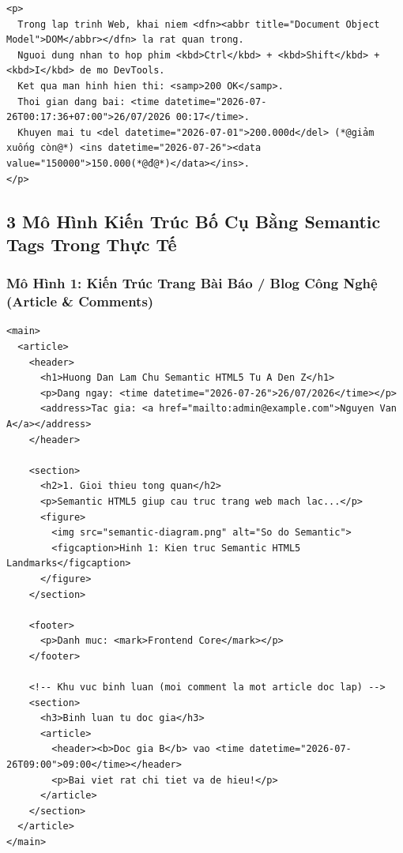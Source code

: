 \begin{codeWindow}
\begin{lstlisting}[language=HTML5]
<p>
  Trong lap trinh Web, khai niem <dfn><abbr title="Document Object Model">DOM</abbr></dfn> la rat quan trong.
  Nguoi dung nhan to hop phim <kbd>Ctrl</kbd> + <kbd>Shift</kbd> + <kbd>I</kbd> de mo DevTools.
  Ket qua man hinh hien thi: <samp>200 OK</samp>.
  Thoi gian dang bai: <time datetime="2026-07-26T00:17:36+07:00">26/07/2026 00:17</time>.
  Khuyen mai tu <del datetime="2026-07-01">200.000d</del> (*@giảm xuống còn@*) <ins datetime="2026-07-26"><data value="150000">150.000(*@đ@*)</data></ins>.
</p>
\end{lstlisting}
\end{codeWindow}

\clearpage
\subsection{3 Mô Hình Kiến Trúc Bố Cụ Bằng Semantic Tags Trong Thực Tế}

\subsubsection{Mô Hình 1: Kiến Trúc Trang Bài Báo / Blog Công Nghệ (Article \& Comments)}

\begin{codeWindowBreakable}
\begin{lstlisting}[language=HTML5]
<main>
  <article>
    <header>
      <h1>Huong Dan Lam Chu Semantic HTML5 Tu A Den Z</h1>
      <p>Dang ngay: <time datetime="2026-07-26">26/07/2026</time></p>
      <address>Tac gia: <a href="mailto:admin@example.com">Nguyen Van A</a></address>
    </header>

    <section>
      <h2>1. Gioi thieu tong quan</h2>
      <p>Semantic HTML5 giup cau truc trang web mach lac...</p>
      <figure>
        <img src="semantic-diagram.png" alt="So do Semantic">
        <figcaption>Hinh 1: Kien truc Semantic HTML5 Landmarks</figcaption>
      </figure>
    </section>

    <footer>
      <p>Danh muc: <mark>Frontend Core</mark></p>
    </footer>

    <!-- Khu vuc binh luan (moi comment la mot article doc lap) -->
    <section>
      <h3>Binh luan tu doc gia</h3>
      <article>
        <header><b>Doc gia B</b> vao <time datetime="2026-07-26T09:00">09:00</time></header>
        <p>Bai viet rat chi tiet va de hieu!</p>
      </article>
    </section>
  </article>
</main>
\end{lstlisting}
\end{codeWindowBreakable}

